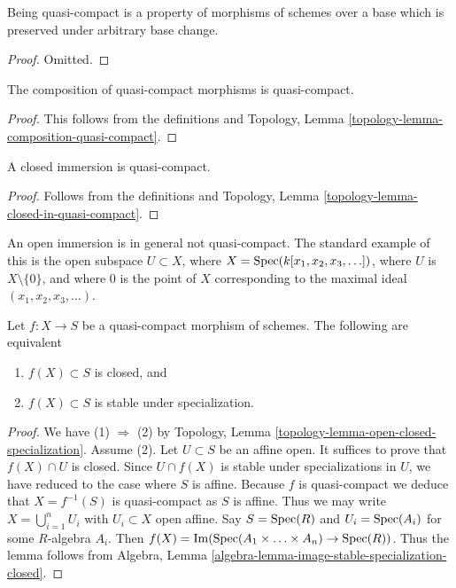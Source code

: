 \begin{lemma}
\label{lemma-quasi-compact-preserved-base-change}
Being quasi-compact is a property of morphisms of schemes
over a base which is preserved under arbitrary base change.
\end{lemma}

\begin{proof}
Omitted.
\end{proof}

\begin{lemma}
\label{lemma-composition-quasi-compact}
The composition of quasi-compact morphisms is quasi-compact.
\end{lemma}

\begin{proof}
This follows from the definitions and
Topology, Lemma \ref{topology-lemma-composition-quasi-compact}.
\end{proof}

\begin{lemma}
\label{lemma-closed-immersion-quasi-compact}
A closed immersion is quasi-compact.
\end{lemma}

\begin{proof}
Follows from the definitions and
Topology, Lemma \ref{topology-lemma-closed-in-quasi-compact}.
\end{proof}

\begin{example}
\label{example-open-immersion-not-quasi-compact}
An open immersion is in general not quasi-compact.
The standard example of this is the open subspace
$U \subset X$, where $X = \mathop{\mathrm{Spec}}(k[x_1, x_2, x_3, \ldots])$,
where $U$ is $X \setminus \{0\}$, and where $0$ is the point
of $X$ corresponding to the maximal ideal
$(x_1, x_2, x_3, \ldots)$.
\end{example}

\begin{lemma}
\label{lemma-image-quasi-compact-closed}
Let $f : X \to S$ be a quasi-compact morphism of schemes.
The following are equivalent
\begin{enumerate}
\item $f(X) \subset S$ is closed, and
\item $f(X) \subset S$ is stable under specialization.
\end{enumerate}
\end{lemma}

\begin{proof}
We have (1) $\Rightarrow$ (2) by
Topology, Lemma \ref{topology-lemma-open-closed-specialization}.
Assume (2). Let $U \subset S$ be an affine open. It suffices to prove
that $f(X) \cap U$ is closed. Since $U \cap f(X)$ is stable under
specializations in $U$, we have reduced to the case where $S$ is affine.
Because $f$ is quasi-compact we deduce that $X = f^{-1}(S)$ is
quasi-compact as $S$ is affine. Thus we may write
$X = \bigcup_{i = 1}^n U_i$ with $U_i \subset X$ open affine.
Say $S = \mathop{\mathrm{Spec}}(R)$ and
$U_i = \mathop{\mathrm{Spec}}(A_i)$ for some $R$-algebra $A_i$.
Then $f(X) = \mathop{\mathrm{Im}}(\mathop{\mathrm{Spec}}(A_1 \times \ldots \times A_n)
\to \mathop{\mathrm{Spec}}(R))$. Thus the lemma follows from
Algebra, Lemma \ref{algebra-lemma-image-stable-specialization-closed}.
\end{proof}


